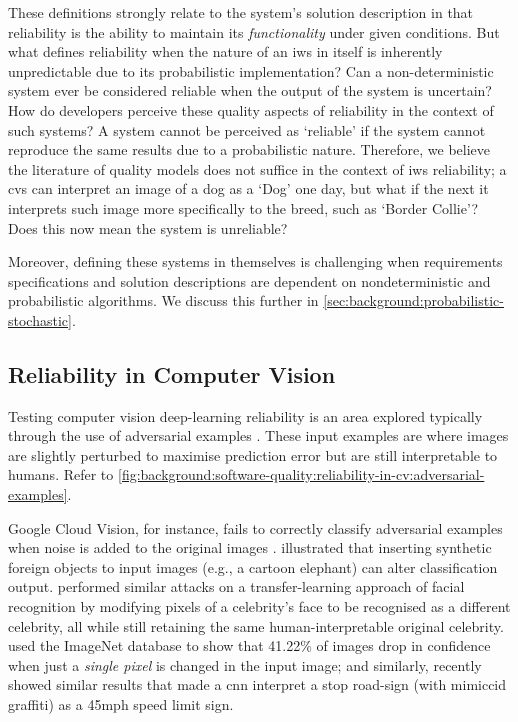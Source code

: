 These definitions strongly relate to the system's solution description in that reliability is the ability to maintain its \textit{functionality} under given conditions. But what defines reliability when the nature of an \gls{iws} in itself is inherently unpredictable due to its probabilistic implementation? Can a non-deterministic system ever be considered reliable when the output of the system is uncertain? How do developers perceive these quality aspects of reliability in the context of such systems? A system cannot be perceived as `reliable' if the system cannot reproduce the same results due to a probabilistic nature. Therefore, we believe the literature of quality models does not suffice in the context of \gls{iws} reliability; a \gls{cvs} can interpret an image of a dog as a `Dog' one day, but what if the next it interprets such image more specifically to the breed, such as `Border Collie'? Does this now mean the system is unreliable? 

Moreover, defining these systems in themselves is challenging when requirements specifications and solution descriptions are dependent on nondeterministic and probabilistic algorithms. We discuss this further in \cref{sec:background:probabilistic-stochastic}.

\subsection{Reliability in Computer Vision}
\label{ssec:background:software-quality:reliability-in-cv}

Testing computer vision deep-learning reliability is an area explored typically through the use of adversarial examples \citep{Szegedy:2013vw}. These input examples are where images are slightly perturbed to maximise prediction error but are still interpretable to humans. Refer to \cref{fig:background:software-quality:reliability-in-cv:adversarial-examples}.



Google Cloud Vision, for instance, fails to correctly classify adversarial examples when noise is added to the original images \citep{Hosseini:2018jr}. \citet{Rosenfeld:2018ut} illustrated that inserting synthetic foreign objects to input images (e.g., a cartoon elephant) can alter classification output. \citet{Wang:2018vl} performed similar attacks on a transfer-learning approach of facial recognition by modifying pixels of a celebrity's face to be recognised as a different celebrity, all while still retaining the same human-interpretable original celebrity. \citet{Su:2017uw} used the ImageNet database to show that 41.22\% of images drop in confidence when just a \textit{single pixel} is changed in the input image; and similarly, \citet{Eykholt:2018vka} recently showed similar results that made a \gls{cnn} interpret a stop road-sign (with mimiccid graffiti) as a 45mph speed limit sign.


